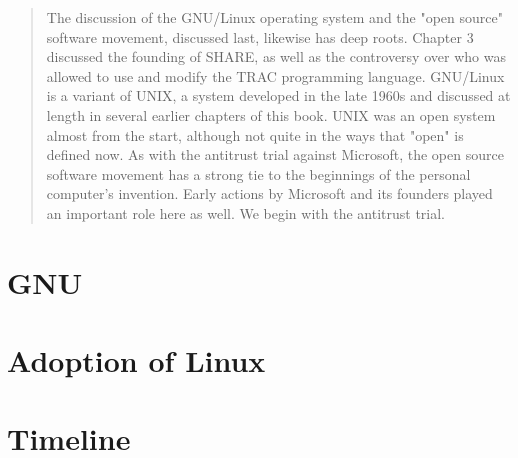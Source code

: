 

\begin{quotation}
	The discussion of the GNU/Linux
	operating system and the "open source" software movement, discussed last,
	likewise has deep roots. Chapter 3 discussed the founding of SHARE, as well as
	the controversy over who was allowed to use and modify the TRAC programming
	language. GNU/Linux is a variant of UNIX, a system developed in the late 1960s
	and discussed at length in several earlier chapters of this book. UNIX was an
	open system almost from the start, although not quite in the ways that "open" is
	defined now. As with the antitrust trial against Microsoft, the open source
	software movement has a strong tie to the beginnings of the personal computer's
	invention. Early actions by Microsoft and its founders played an important role
	here as well. We begin with the
	antitrust trial.\cite{history_of_modern_computing_2003_ceruzzi}
\end{quotation}

\section{GNU}

\section{Adoption of Linux}



\pagebreak\section{Timeline}


